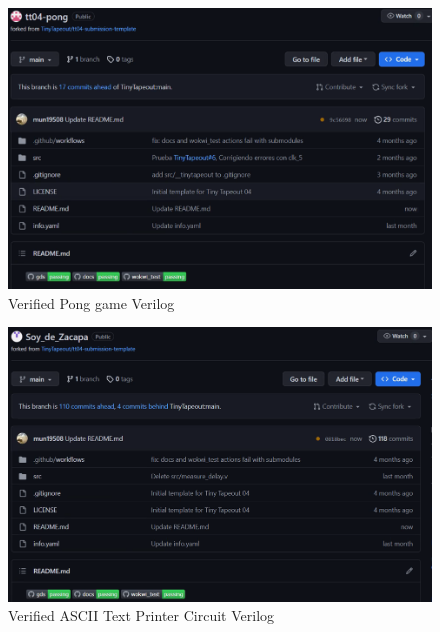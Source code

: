 \begin{figure}[tbh]
    \centering
    \includegraphics[width=\linewidth]{Pictures/pong.png}
    \caption{Verified Pong game Verilog}\label{fig:pong_verified}
\end{figure}

\begin{figure}[tbh]
    \centering
    \includegraphics[width=\linewidth]{Pictures/verifide_zacapa.png}
    \caption{Verified ASCII Text Printer Circuit Verilog}\label{fig:ascii_verified}
\end{figure}

